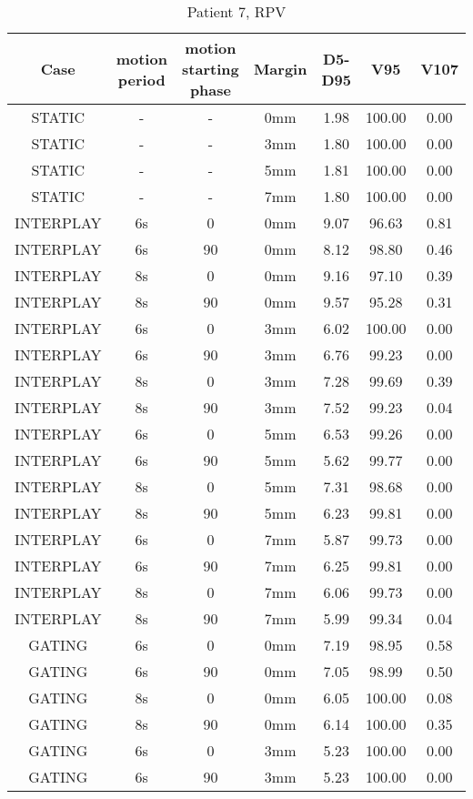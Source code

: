 \begin{table}[H]
  \centering
  \caption{Patient 7, RPV}
  \begin{tabular}{|c||c|c|c||c|c|c|}
    \hline\hline
    Case & motion period & motion starting phase & Margin & D5-D95 & V95 & V107\\
    \hline 
STATIC & - & - & 0mm & 1.98 & 100.00 & 0.00 \\
STATIC & - & - & 3mm & 1.80 & 100.00 & 0.00 \\
STATIC & - & - & 5mm & 1.81 & 100.00 & 0.00 \\
STATIC & - & - & 7mm & 1.80 & 100.00 & 0.00 \\
INTERPLAY & 6s & 0 & 0mm & 9.07 & 96.63 & 0.81 \\
INTERPLAY & 6s & 90 & 0mm & 8.12 & 98.80 & 0.46 \\
INTERPLAY & 8s & 0 & 0mm & 9.16 & 97.10 & 0.39 \\
INTERPLAY & 8s & 90 & 0mm & 9.57 & 95.28 & 0.31 \\
INTERPLAY & 6s & 0 & 3mm & 6.02 & 100.00 & 0.00 \\
INTERPLAY & 6s & 90 & 3mm & 6.76 & 99.23 & 0.00 \\
INTERPLAY & 8s & 0 & 3mm & 7.28 & 99.69 & 0.39 \\
INTERPLAY & 8s & 90 & 3mm & 7.52 & 99.23 & 0.04 \\
INTERPLAY & 6s & 0 & 5mm & 6.53 & 99.26 & 0.00 \\
INTERPLAY & 6s & 90 & 5mm & 5.62 & 99.77 & 0.00 \\
INTERPLAY & 8s & 0 & 5mm & 7.31 & 98.68 & 0.00 \\
INTERPLAY & 8s & 90 & 5mm & 6.23 & 99.81 & 0.00 \\
INTERPLAY & 6s & 0 & 7mm & 5.87 & 99.73 & 0.00 \\
INTERPLAY & 6s & 90 & 7mm & 6.25 & 99.81 & 0.00 \\
INTERPLAY & 8s & 0 & 7mm & 6.06 & 99.73 & 0.00 \\
INTERPLAY & 8s & 90 & 7mm & 5.99 & 99.34 & 0.04 \\
GATING & 6s & 0 & 0mm & 7.19 & 98.95 & 0.58 \\
GATING & 6s & 90 & 0mm & 7.05 & 98.99 & 0.50 \\
GATING & 8s & 0 & 0mm & 6.05 & 100.00 & 0.08 \\
GATING & 8s & 90 & 0mm & 6.14 & 100.00 & 0.35 \\
GATING & 6s & 0 & 3mm & 5.23 & 100.00 & 0.00 \\
GATING & 6s & 90 & 3mm & 5.23 & 100.00 & 0.00 \\

\end{tabular}
\end{table}
